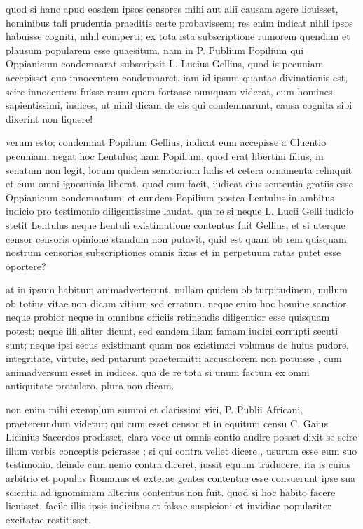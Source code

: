  quod si hanc apud eosdem ipsos censores mihi aut alii causam agere licuisset, hominibus tali prudentia praeditis certe probavissem; res enim indicat nihil ipsos habuisse cogniti, nihil comperti; ex tota ista subscriptione rumorem quendam et plausum popularem esse quaesitum. nam in P. Publium Popilium qui Oppianicum condemnarat subscripsit L. Lucius Gellius, quod is pecuniam accepisset quo innocentem condemnaret. iam id ipsum quantae divinationis est, scire innocentem fuisse reum quem fortasse numquam viderat, cum homines sapientissimi, iudices, ut nihil dicam de eis qui condemnarunt, causa cognita sibi dixerint non liquere!

 verum esto; condemnat Popilium Gellius, iudicat eum accepisse a Cluentio pecuniam. negat hoc Lentulus; nam Popilium, quod erat libertini filius, in senatum non legit, locum quidem senatorium ludis et cetera ornamenta relinquit et eum omni ignominia liberat. quod cum facit, iudicat eius sententia gratiis esse Oppianicum condemnatum. et eundem Popilium postea Lentulus in ambitus iudicio pro testimonio diligentissime laudat. qua re si neque L. Lucii Gelli iudicio stetit Lentulus neque Lentuli existimatione contentus fuit Gellius, et si uterque censor censoris opinione standum non putavit, quid est quam ob rem quisquam nostrum censorias subscriptiones omnis fixas et in perpetuum ratas putet esse oportere?

 at in ipsum habitum animadverterunt. nullam quidem ob turpitudinem, nullum ob totius vitae non dicam vitium sed erratum. neque enim hoc homine sanctior neque probior neque in omnibus officiis retinendis diligentior esse quisquam potest; neque illi aliter dicunt, sed eandem illam famam iudici corrupti secuti sunt; neque ipsi secus existimant quam nos existimari volumus de huius pudore, integritate, virtute, sed putarunt praetermitti accusatorem non potuisse , cum animadversum esset in iudices. qua de re tota si unum factum ex omni antiquitate protulero, plura non dicam.

 non enim mihi exemplum summi et clarissimi viri, P. Publii Africani, praetereundum videtur; qui cum esset censor et in equitum censu C. Gaius Licinius Sacerdos prodisset, clara voce ut omnis contio audire posset dixit se scire illum verbis conceptis peierasse ; si qui contra vellet dicere , usurum esse eum suo testimonio. deinde cum nemo contra diceret, iussit equum traducere. ita is cuius arbitrio et populus Romanus et exterae gentes contentae esse consuerunt ipse sua scientia ad ignominiam alterius contentus non fuit. quod si hoc habito facere licuisset, facile illis ipsis iudicibus et falsae suspicioni et invidiae populariter excitatae restitisset.

